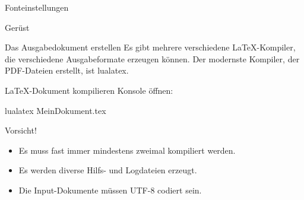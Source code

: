 \begin{frame}[fragile]{Fonteinstellungen}
  \begin{lstverbatim}
  \setmainfont[
    SmallCapsFont = {Latin Modern Roman Caps},
    SlantedFont = {Latin Modern Roman Slanted},
    ItalicFeatures  = {
      SmallCapsFont = {LMRomanCaps10-Oblique}
    },
    ]{Latin Modern Roman}

  \setsansfont{Latin Modern Sans}

  \setmonofont[
    SmallCapsFont = {Latin Modern Mono Caps},
    SlantedFont = {Latin Modern Mono Slanted},
    ItalicFeatures  = {
      SmallCapsFont = {LMMonoCaps10-Oblique}
    },
    ]{Latin Modern Mono}
  \end{lstverbatim}
\end{frame}

\begin{frame}[fragile]{Gerüst}
\end{frame}

\begin{frame}[fragile]{Das Ausgabedokument erstellen}
  Es gibt mehrere verschiedene \LaTeX-Kompiler, die verschiedene Ausgabeformate erzeugen können.
  Der modernste Kompiler, der PDF-Dateien erstellt, ist \alert{lualatex}.

  \begin{block}{\LaTeX-Dokument kompilieren}
    Konsole öffnen:
    \begin{lstverbatim}
    lualatex MeinDokument.tex
    \end{lstverbatim}
  \end{block}
  \begin{alertblock}{Vorsicht!}
    \begin{itemize}
      \item Es muss fast immer mindestens zweimal kompiliert werden.
      \item Es werden diverse Hilfs- und Logdateien erzeugt.
      \item Die Input-Dokumente müssen UTF-8 codiert sein.
    \end{itemize}
  \end{alertblock}
\end{frame}
